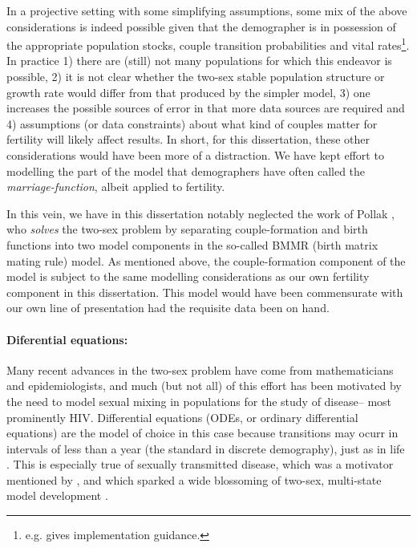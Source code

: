 In a projective setting with some simplifying assumptions, some mix of the above
considerations is indeed possible given that the demographer is in possession of
the appropriate population stocks, couple transition probabilities and
vital rates\footnote{e.g. \citep{schoen1987modeling} gives implementation
guidance.}. In practice 1) there are (still) not many populations for which this
endeavor is possible, 2) it is not clear whether the two-sex stable population
structure or growth rate would differ from that produced by the simpler model,
3) one increases the possible sources of error in that more data sources are
required and 4) assumptions (or data constraints) about what kind of couples
matter for fertility will likely affect results. In short, for this
dissertation, these other considerations would have been more of a distraction.
We have kept effort to modelling the part of the model that demographers have
often called the \textit{marriage-function}, albeit applied to fertility.

In this vein, we have in this dissertation notably neglected the work of Pollak
\citep{pollak1986reformulation, pollak1987two, pollak1990two}, who
\textit{solves} the two-sex problem by separating couple-formation and birth
functions into two model components in the so-called BMMR (birth matrix mating
rule) model. As mentioned above, the couple-formation component of the model is
subject to the same modelling considerations as our own fertility component in
this dissertation. This model would have been commensurate with our own line of
presentation had the requisite data been on hand.

\paragraph{Diferential equations: } Many recent advances in the two-sex problem
have come from mathematicians and epidemiologists, and much (but not all) of
this effort has been motivated by the need to model sexual mixing in
populations for the study of disease-- most prominently HIV. Differential
equations (ODEs, or ordinary differential equations) are the model of choice in
this case because transitions may ocurr in intervals of less than a year 
(the standard in discrete demography), just as in
life \citep{hoppensteadt1975mathematical}. This is especially true of sexually
transmitted disease, which was a motivator mentioned by \citet{hadeler1988models}, and which sparked a wide blossoming
of two-sex, multi-state model development
\citep{dietz1988epidemiological,hadeler1989pair,busenberg1991general,blythe1991toward}.

